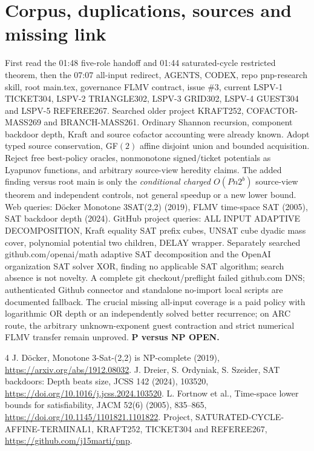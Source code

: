 \documentclass[11pt]{article}
\begin{document}
\section{Corpus, duplications, sources and missing link}
First read the 01:48 five-role handoff and 01:44 saturated-cycle restricted theorem, then the 07:07 all-input redirect, AGENTS, CODEX, repo pnp-research skill, root main.tex, governance FLMV contract, issue \#3, current LSPV-1 TICKET304, LSPV-2 TRIANGLE302, LSPV-3 GRID302, LSPV-4 GUEST304 and LSPV-5 REFEREE267. Searched older project KRAFT252, COFACTOR-MASS269 and BRANCH-MASS261. Ordinary Shannon recursion, component backdoor depth, Kraft and source cofactor accounting were already known. Adopt typed source conservation, GF$(2)$ affine disjoint union and bounded acquisition. Reject free best-policy oracles, nonmonotone signed/ticket potentials as Lyapunov functions, and arbitrary source-view heredity claims. The added finding versus root main is only the \emph{conditional charged $O(Pn2^b)$} source-view theorem and independent controls, not general speedup or a new lower bound.
Web queries: D\"ocker Monotone 3SAT(2,2) (2019), FLMV time-space SAT (2005), SAT backdoor depth (2024). GitHub project queries: ALL INPUT ADAPTIVE DECOMPOSITION, Kraft equality SAT prefix cubes, UNSAT cube dyadic mass cover, polynomial potential two children, DELAY wrapper. Separately searched github.com/openai/math adaptive SAT decomposition and the OpenAI organization SAT solver XOR, finding no applicable SAT algorithm; search absence is not novelty. A complete git checkout/preflight failed github.com DNS; authenticated Github connector and standalone no-import local scripts are documented fallback. The crucial missing all-input coverage is a paid policy with logarithmic OR depth or an independently solved better recurrence; on ARC route, the arbitrary unknown-exponent guest contraction and strict numerical FLMV transfer remain unproved. \textbf{P versus NP OPEN.}
\begin{thebibliography}{4}
 J. D\"ocker, Monotone 3-Sat-(2,2) is NP-complete (2019), \url{https://arxiv.org/abs/1912.08032}.
 J. Dreier, S. Ordyniak, S. Szeider, SAT backdoors: Depth beats size, JCSS 142 (2024), 103520, \url{https://doi.org/10.1016/j.jcss.2024.103520}.
 L. Fortnow et al., Time-space lower bounds for satisfiability, JACM 52(6) (2005), 835--865, \url{https://doi.org/10.1145/1101821.1101822}.
 Project, SATURATED-CYCLE-AFFINE-TERMINAL1, KRAFT252, TICKET304 and REFEREE267, \url{https://github.com/j15marti/pnp}.
\end{thebibliography}
\end{document}

